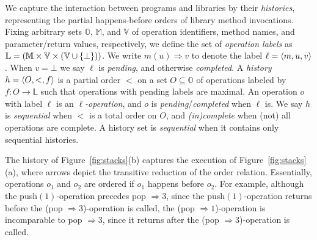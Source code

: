 We capture the interaction between programs and libraries by their
\emph{histories}, representing the partial happens-before orders of library
method invocations. Fixing arbitrary sets $\mathbb{O}$, $\mathbb{M}$, and
$\mathbb{V}$ of operation identifiers, method names, and parameter/return
values, respectively, we define the set of \emph{operation labels} as
$\mathbb{L} = (\mathbb{M} \times \mathbb{V} \times (\mathbb{V} \cup
{\{ \bot \}}))$. We write $m(u) \Rightarrow v$ to denote the label $\ell =
{\langle{m,u,v}\rangle}$. When $v = \bot$ we say $\ell$ is \emph{pending}, and otherwise
\emph{completed}. A \emph{history} $h = {\langle{O,<,f}\rangle}$ is a partial order $<$ on
a set $O \subseteq \mathbb{O}$ of operations labeled by $f : O \to \mathbb{L}$
such that operations with pending labels are maximal. An operation $o$ with
label $\ell$ is an \emph{$\ell$-operation}, and $o$ is
\emph{pending}/\emph{completed} when $\ell$ is. We say $h$ is \emph{sequential}
when $<$ is a total order on $O$, and \emph{(in)complete} when (not) all
operations are complete. A history set is \emph{sequential} when it contains
only sequential histories.

\begin{example}

  The history of Figure~\ref{fig:stacks}(b) captures the execution of
  Figure~\ref{fig:stacks}(a), where arrows depict the transitive reduction of
  the order relation. Essentially, operations $o_1$ and $o_2$ are ordered if
  $o_1$ happens before $o_2$. For example, although the push$(1)$-operation
  precedes pop $\Rightarrow 3$, since the push$(1)$-operation returns before
  the (pop $\Rightarrow 3$)-operation is called, the (pop $\Rightarrow
  1$)-operation is incomparable to pop $\Rightarrow 3$, since it returns
  after the (pop $\Rightarrow 3$)-operation is called.

\end{example}

